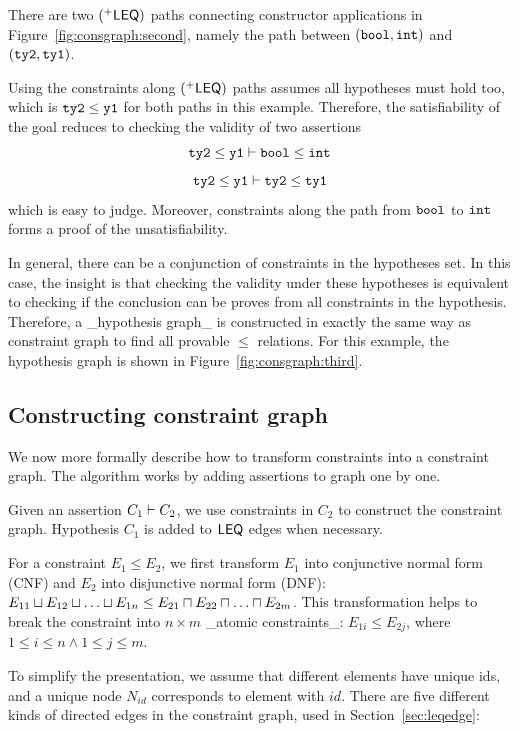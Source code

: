 There are two $(^{+}\mathsf{LEQ})$ paths connecting constructor
applications in Figure~\ref{fig:consgraph:second}, namely the path
between $(\mathtt{bool, int})$ and $(\mathtt{ty2, ty1})$. 

Using the constraints along $(^{+}\mathsf{LEQ})$ paths assumes all
hypotheses must hold too, which is $\mathtt{ty2}\leq \mathtt{y1}$ for
both paths in this example. Therefore, the satisfiability of the goal
reduces to checking the validity of two assertions 
%
\[\mathtt{ty2}\leq \mathtt{y1}\vdash \mathtt{bool}\leq \mathtt{int}\]
\[\mathtt{ty2}\leq \mathtt{y1}\vdash \mathtt{ty2}\leq \mathtt{ty1}\]
\noindent
which is easy to judge. Moreover, constraints along the path from
$\mathtt{bool}$ to $\mathtt{int}$ forms a proof of the unsatisfiability.

In general, there can be a conjunction of constraints in the
hypotheses set. In this case, the insight is that checking the
validity under these hypotheses is equivalent to checking if the
conclusion can be proves from all constraints in the hypothesis.
Therefore, a _hypothesis graph_ is constructed in exactly the same
way as constraint graph to find all provable $\leq$ relations. For
this example, the hypothesis graph is shown in
Figure~\ref{fig:consgraph:third}. 

\subsection{Constructing constraint graph}
\label{sec:consgraph}

We now more formally describe how to transform constraints
into a constraint graph. The algorithm works by adding assertions to
graph one by one.

Given an assertion $C_1 \vdash C_2$, we use constraints in $C_2$ to
construct the constraint graph. Hypothesis $C_1$ is added to $\mathsf{LEQ}$
edges when necessary.

For a constraint $E_1 \leq E_2$, we first transform $E_1$ into
conjunctive normal form (CNF) and $E_2$ into disjunctive normal form
(DNF): $E_{11}\join E_{12} \join \dots \join E_{1n} \leq E_{21}\meet
E_{22} \meet \dots \meet E_{2m}$. This transformation helps to break
the constraint into $n\times m$ _atomic constraints_: $E_{1i}\leq
E_{2j}$, where $1\leq i\leq n \land 1\leq j\leq m$.

To simplify the presentation, we assume that different elements have
unique ids, and a unique node $N_{id}$ corresponds to element with
$id$. There are five different kinds of directed edges in the
constraint graph, used in Section~\ref{sec:leqedge}:

